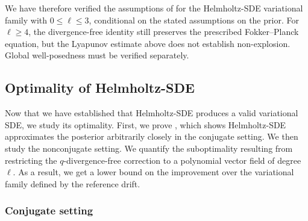 We have therefore verified the assumptions of  for the Helmholtz-SDE variational family with $0 \leq \ell \leq 3$, conditional on the stated assumptions on the prior.  
For $\ell \geq 4$, the divergence-free identity still preserves the prescribed Fokker--Planck equation, but the Lyapunov estimate above does not establish non-explosion. 
Global well-posedness must be verified separately.

\subsection{Optimality of Helmholtz-SDE}
\label{app:subsec:optimality}

Now that we have established that Helmholtz-SDE produces a valid variational SDE, we study its optimality.
First, we prove , which shows Helmholtz-SDE approximates the posterior arbitrarily closely in the conjugate setting.
We then study the nonconjugate setting. 
We quantify the suboptimality resulting from restricting the $q$-divergence-free correction to a polynomial vector field of degree $\ell$.
As a result, we get a lower bound on the improvement over the variational family defined by the reference drift.

\subsubsection{Conjugate setting}
\label{app:subsec:optimality-conj}


